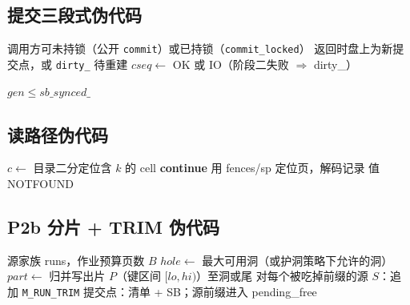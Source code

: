 \subsection{提交三段式伪代码}
\begin{algorithm}[H]
\caption{Commit（ROUND17 出锁版）}
\begin{algorithmic}[1]
\Require 调用方可未持锁（公开 \texttt{commit}）或已持锁（\texttt{commit\_locked}）
\Ensure 返回时盘上为新提交点，或 \texttt{dirty\_} 待重建
\State $cseq \gets$ 
  \State {}
  \State {}
  \State {}
\Else
  \State {}
\EndIf
\State {}
\State \Return OK 或 IO（阶段二失败 $\Rightarrow$ dirty\_）
\end{algorithmic}
\end{algorithm}

\begin{algorithm}[H]
\caption{页复用闸（代数）}
\begin{algorithmic}[1]
  \State \Return $gen \le sb\_synced\_$
\EndFunction
\end{algorithmic}
\end{algorithm}

\subsection{读路径伪代码}
\begin{algorithm}[H]
\caption{Get($k$, $view$)}
\begin{algorithmic}[1]
\State $c \gets$ 目录二分定位含 $k$ 的 cell
   \textbf{continue}
  \EndIf
  \State 用 fences/sp 定位页，解码记录
    \State \Return 值
  \EndIf
\EndFor
\State \Return NOTFOUND
\end{algorithmic}
\end{algorithm}

\subsection{P2b 分片 + TRIM 伪代码}
\begin{algorithm}[H]
\caption{MergeJob 一片（示意）}
\begin{algorithmic}[1]
\Require 源家族 runs，作业预算页数 $B$
\State $hole \gets$ 最大可用洞（或护洞策略下允许的洞）
\State $part \gets$ 
\State 归并写出片 $P$（键区间 $[lo,hi)$）至洞或尾
\State 对每个被吃掉前缀的源 $S$：追加 \texttt{M\_RUN\_TRIM}
\State 提交点：清单 + SB；源前缀进入 pending\_free
\end{algorithmic}
\end{algorithm}

